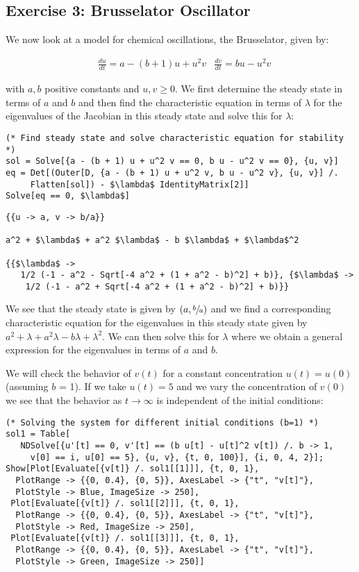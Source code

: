 \documentclass[11pt,a4paper,onecolumn]{article}
\begin{document}
\subsection{Exercise 3: Brusselator Oscillator}
We now look at a model for chemical oscillations, the Brusselator, given by:

\begin{align*}
  &\frac{du}{dt} = a - (b + 1)u + u^2 v \nonumber
  &\frac{dv}{dt} = b u - u^2 v
\end{align*}

with $a,b$ positive constants and $u,v \geq 0$. We first determine the steady state in terms of $a$ and $b$ and then find the characteristic equation in terms of $\lambda$ for the eigenvalues of the Jacobian in this steady state and solve this for $\lambda$:

\begin{lstlisting}[mathescape]
(* Find steady state and solve characteristic equation for stability *)
sol = Solve[{a - (b + 1) u + u^2 v == 0, b u - u^2 v == 0}, {u, v}]
eq = Det[(Outer[D, {a - (b + 1) u + u^2 v, b u - u^2 v}, {u, v}] /. 
     Flatten[sol]) - $\lambda$ IdentityMatrix[2]]
Solve[eq == 0, $\lambda$]
\end{lstlisting}

\begin{lstlisting}[mathescape]
{{u -> a, v -> b/a}}

a^2 + $\lambda$ + a^2 $\lambda$ - b $\lambda$ + $\lambda$^2

{{$\lambda$ -> 
   1/2 (-1 - a^2 - Sqrt[-4 a^2 + (1 + a^2 - b)^2] + b)}, {$\lambda$ ->
    1/2 (-1 - a^2 + Sqrt[-4 a^2 + (1 + a^2 - b)^2] + b)}}
\end{lstlisting}

We see that the steady state is given by $(a,\sfrac{b}{a})$ and we find a corresponding characteristic equation for the eigenvalues in this steady state given by $a^2 + \lambda + a^2 \lambda - b \lambda + \lambda^2$. We can then solve this for $\lambda$ where we obtain a general expression for the eigenvalues in terms of $a$ and $b$.

We will check the behavior of $v(t)$ for a constant concentration $u(t) = u(0)$ (assuming $b$ = 1). If we take $u(t) = 5$ and we vary the concentration of $v(0)$ we see that the behavior as $t \rightarrow \infty$ is independent of the initial conditions:

\begin{lstlisting}[mathescape]
(* Solving the system for different initial conditions (b=1) *)
sol1 = Table[
   NDSolve[{u'[t] == 0, v'[t] == (b u[t] - u[t]^2 v[t]) /. b -> 1, 
     v[0] == i, u[0] == 5}, {u, v}, {t, 0, 100}], {i, 0, 4, 2}];
Show[Plot[Evaluate[{v[t]} /. sol1[[1]]], {t, 0, 1}, 
  PlotRange -> {{0, 0.4}, {0, 5}}, AxesLabel -> {"t", "v[t]"}, 
  PlotStyle -> Blue, ImageSize -> 250],
 Plot[Evaluate[{v[t]} /. sol1[[2]]], {t, 0, 1}, 
  PlotRange -> {{0, 0.4}, {0, 5}}, AxesLabel -> {"t", "v[t]"}, 
  PlotStyle -> Red, ImageSize -> 250], 
 Plot[Evaluate[{v[t]} /. sol1[[3]]], {t, 0, 1}, 
  PlotRange -> {{0, 0.4}, {0, 5}}, AxesLabel -> {"t", "v[t]"}, 
  PlotStyle -> Green, ImageSize -> 250]]
\end{lstlisting}
\end{document}
